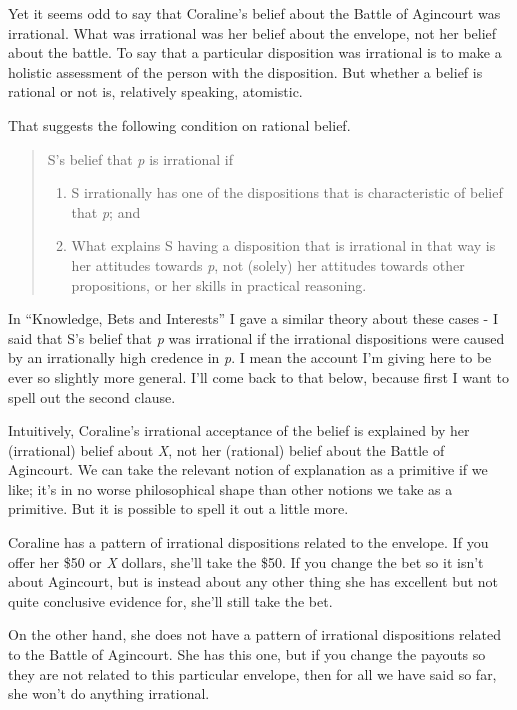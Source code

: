 \documentclass[
  11pt,
]{book}
\providecommand{\tightlist}{%
  \setlength{\itemsep}{0pt}\setlength{\parskip}{0pt}}
\begin{document}
Yet it seems odd to say that Coraline's belief about the Battle of Agincourt was irrational. What was irrational was her belief about the envelope, not her belief about the battle. To say that a particular disposition was irrational is to make a holistic assessment of the person with the disposition. But whether a belief is rational or not is, relatively speaking, atomistic.

That suggests the following condition on rational belief.

\begin{quote}
S's belief that \emph{p} is irrational if

\begin{enumerate}
\def\labelenumi{\arabic{enumi}.}
\tightlist
\item
  S irrationally has one of the dispositions that is characteristic of belief that \emph{p}; and
\item
  What explains S having a disposition that is irrational in that way is her attitudes towards \emph{p}, not (solely) her attitudes towards other propositions, or her skills in practical reasoning.
\end{enumerate}
\end{quote}

In ``Knowledge, Bets and Interests'' \citep{Weatherson2012} I gave a similar theory about these cases - I said that S's belief that \emph{p} was irrational if the irrational dispositions were caused by an irrationally high credence in \emph{p}. I mean the account I'm giving here to be ever so slightly more general. I'll come back to that below, because first I want to spell out the second clause.

Intuitively, Coraline's irrational acceptance of the belief is explained by her (irrational) belief about \emph{X}, not her (rational) belief about the Battle of Agincourt. We can take the relevant notion of explanation as a primitive if we like; it's in no worse philosophical shape than other notions we take as a primitive. But it is possible to spell it out a little more.

Coraline has a pattern of irrational dispositions related to the envelope. If you offer her \$50 or \emph{X} dollars, she'll take the \$50. If you change the bet so it isn't about Agincourt, but is instead about any other thing she has excellent but not quite conclusive evidence for, she'll still take the bet.

On the other hand, she does not have a pattern of irrational dispositions related to the Battle of Agincourt. She has this one, but if you change the payouts so they are not related to this particular envelope, then for all we have said so far, she won't do anything irrational.
\end{document}
